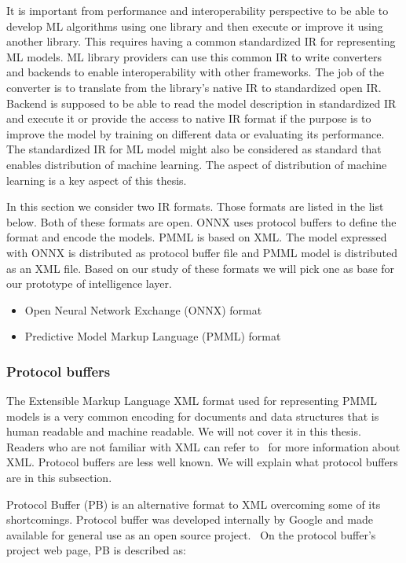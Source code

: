 \documentclass[english, 12pt, a4paper, elec, utf8, online]{aaltothesis}
\begin{document}
It is important from performance and interoperability perspective to be able to develop ML algorithms using one library and then execute or improve it using another library. This requires having a common standardized IR for representing ML models. ML library providers can use this common IR to write converters and backends to enable interoperability with other frameworks. The job of the converter is to translate from the library's native IR to standardized open IR. Backend is supposed to be able to read the model description in standardized IR and execute it or provide the access to native IR format if the purpose is to improve the model by training on different data or evaluating its performance. The standardized IR for ML model might also be considered as standard that enables distribution of machine learning. The aspect of distribution of machine learning is a key aspect of this thesis.

In this section we consider two IR formats. Those formats are listed in the list below. Both of these formats are open. ONNX uses protocol buffers to define the format  and encode the models. PMML is based on XML. The model expressed with ONNX is distributed as protocol buffer file and PMML model is distributed as an XML file. Based on our study of these formats we will pick one as base for our prototype of intelligence layer.

\begin{itemize}
\item
Open Neural Network Exchange (ONNX) format
\item
Predictive Model Markup Language (PMML) format
\end{itemize}

\subsubsection{Protocol buffers}
The Extensible Markup Language XML format used for representing PMML models is a very common encoding for documents and data structures that is human readable and machine readable. We will not cover it in this thesis. Readers who are not familiar with XML can refer to~\cite{bray2008extensible} for more information about XML. Protocol buffers are less well known. We will explain what protocol buffers are in this subsection.

Protocol Buffer (PB) is an alternative format to XML overcoming some of its shortcomings. Protocol buffer was developed internally by Google and made available for general use as an open source project.~\cite{kaur2010evaluation} On the protocol buffer's project web page, PB is described as:
\end{document}
